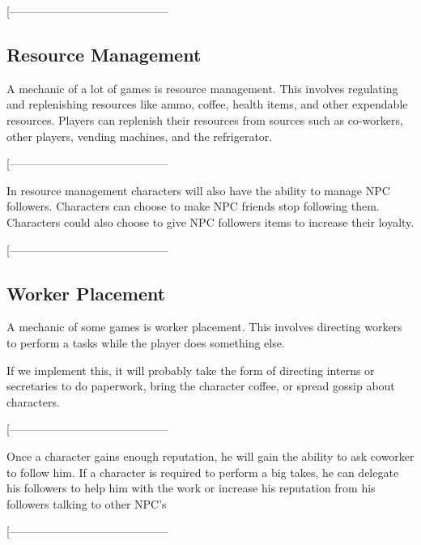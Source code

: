 \documentclass[9pt]{article}
\begin{document}
[------------------------------------------
\smallskip















\subsection*{Resource Management}
A mechanic of a lot of games is resource management. 
This involves regulating and replenishing resources like 
ammo, coffee, health items, and other expendable resources. 
Players can replenish their resources from sources such as
co-workers, other players, vending machines, and the refrigerator.


\smallskip
[------------------------------------------
\smallskip

In resource management characters will also have the ability to manage NPC followers. Characters can choose to make NPC friends stop following them. Characters could also choose to give NPC followers items to increase their loyalty.

[------------------------------------------
\smallskip







\subsection*{Worker Placement}
A mechanic of some games is worker placement. This involves
directing workers to perform a tasks while the player does 
something else. 

If we implement this, it will probably take the form of 
directing interns or secretaries to do paperwork, 
bring the character coffee, or spread gossip about characters. 

\smallskip
[------------------------------------------
\smallskip

Once a character gains enough reputation, he will gain the ability to ask coworker to follow him. If a character is required to perform a big takes, he can delegate his followers to help him with the work or increase his reputation from his followers talking to other NPC’s

\smallskip
[------------------------------------------
\end{document}
